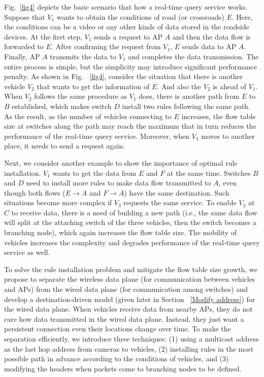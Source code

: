 \documentclass[journal]{IEEEtran}
\begin{document}
Fig.~\ref{fig4} depicts the basic scenario that how a real-time query service works. Suppose that $V_{1}$ wants to obtain the conditions of road (or crossroads) $E$. Here, the conditions can be a video or any other kinds of data stored in the roadside devices. At the first step, $V_{1}$ sends a request to AP $A$ and then the data flow is forwarded to $E$. After confirming the request from $V_{1}$, $E$ sends data to AP $A$. Finally, AP $A$ transmits the data to $V_{1}$ and completes the data transmission. The entire process is simple, but the simplicity may introduce significant performance penalty. As shown in Fig. ~\ref{fig4}, consider the situation that there is another vehicle $V_{2}$ that wants to get the information of $E$. And also the $V_{2}$ is ahead of $V_{1}$. When $V_{2}$ follows the same procedure as $V_{1}$ does, there is another path from $E$ to $B$ established, which makes switch $D$ install two rules following the same path. As the result, as the number of vehicles connecting to $E$ increases, the flow table size at switches along the path may reach the maximum that in turn reduces the performance of the real-time query service. Moreover, when $V_{1}$ moves to another place, it needs to send a request again.



Next, we consider another example to show the importance of optimal rule installation. $V_{1}$ wants to get the data from $E$ and $F$ at the same time. Switches $B$ and $D$ need to install more rules to make data flow transmitted to $A$, even though both flows ($E \to A$ and $F \to A$) have the same destination. Such situations become more complex if $V_{3}$ requests the same service. To enable $V_{3}$ at $C$ to receive data, there is a need of building a new path (i.e., the same data flow will split at the attaching switch of the three vehicles, then the switch becomes a branching node), which again increases the flow table size. The mobility of vehicles increases the complexity and degrades performance of the real-time query service as well.

To solve the rule installation problem and mitigate the flow table size growth, we propose to separate the wireless data plane (for communication between vehicles and APs) from the wired data plane (for communication among switches) and develop a destination-driven model (given later in Section ~\ref{Modify address}) for the wired data plane. When vehicles receive data from nearby APs, they do not care how data transmitted in the wired data plane. Instead, they just want a persistent connection even their locations change over time. To make the separation efficiently, we introduce three techniques: (1) using a multicast address as the last hop address from cameras to vehicles, (2) installing rules in the most possible path in advance according to the conditions of vehicles, and (3) modifying the headers when packets come to branching nodes to be defined.
\end{document}
